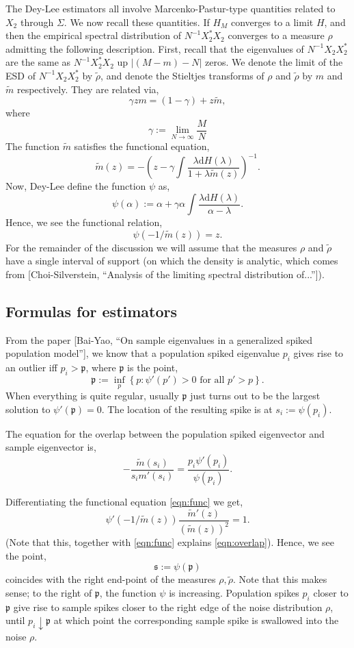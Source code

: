 \documentclass[11 pt, reqno]{article}
\def\beq{\begin{equation}}
\def\eeq{\end{equation}}
\def\mfp{\mathfrak{p}}
\def\mfs{\mathfrak{s}}
\def\d{\mathrm{d}}
\begin{document}
The Dey-Lee estimators all involve Marcenko-Pastur-type quantities related to $X_2$ through $\Sigma$.  We now recall these quantities.  If $H_M$ converges to a limit $H$, and  then the empirical spectral distribution of $N^{-1} X_2^* X_2$ converges to a measure $\rho$ admitting the following description.  First, recall that the eigenvalues of $N^{-1} X_2 X_2^*$ are the same as $N^{-1} X_2^* X_2$ up $|(M-m) - N|$ zeros. We denote the limit of the ESD of $N^{-1} X_2 X_2^*$ by  $\tilde{\rho}$, and denote the Stieltjes transforms of $\rho$ and $\tilde{\rho}$ by $m$ and $\tilde{m}$ respectively.  They are related via,
\beq
\gamma z m = (1 - \gamma ) + z \tilde{m},
\eeq
where
\beq
\gamma := \lim_{N \to \infty} \frac{M}{N}
\eeq
The function $\tilde{m}$ satisfies the functional equation,
\beq
\tilde{m} (z) = - \left( z - \gamma \int \frac{ \lambda \d H ( \lambda ) }{ 1 + \lambda \tilde{m} (z)} \right)^{-1}.
\eeq
Now, Dey-Lee define the function $\psi$ as,
\beq
\psi ( \alpha ) := \alpha + \gamma \alpha \int \frac{ \lambda \d H ( \lambda ) }{ \alpha - \lambda }.
\eeq
Hence, we see the functional relation,
\beq \label{eqn:func}
\psi ( -1 / \tilde{m} (z) ) = z.
\eeq
For the remainder of the discussion we will assume that the measures $\rho$ and $\tilde{\rho}$ have a single interval of support (on which the density is analytic, which comes from [Choi-Silverstein, ``Analysis of the limiting spectral distribution of...'']).  

\subsection{Formulas for estimators}

From the paper [Bai-Yao, ``On sample eigenvalues in a generalized spiked population model''], we know that a population  spiked eigenvalue $p_i$ gives rise to an outlier iff $p_i > \mfp$, where $\mfp$ is the point,
\beq
\mfp := \inf_{p} \left\{ p : \psi' ( p') > 0 \mbox{ for all } p' > p \right\}.
\eeq
When everything is quite regular, usually $\mfp$ just turns out to be the largest solution to $\psi' ( \mfp ) = 0$.   The location of the resulting spike is at $s_i := \psi ( p_i)$.

The equation for the overlap between the population spiked eigenvector and sample eigenvector is,
\beq \label{eqn:overlap}
- \frac{ \tilde{m} (s_i ) }{ s_i m' (s_i ) } = \frac{ p_i \psi' ( p_i ) }{ \psi ( p_i ) }.
\eeq

 Differentiating the functional equation \eqref{eqn:func} we get,
\beq
\psi' ( -1 / \tilde{m} (z) ) \frac{ \tilde{m}' (z) }{ ( \tilde{m} (z) )^2 } = 1.
\eeq
(Note that this, together with \eqref{eqn:func} explains \eqref{eqn:overlap}). 
Hence, we see the point,
\beq
\mfs := \psi ( \mfp )
\eeq
coincides with the right end-point of the measures $\rho, \tilde{\rho}$.  Note that this makes sense; to the right of $\mfp$, the function $\psi$ is increasing.  Population spikes $p_i$ closer to $\mfp$ give rise to sample spikes closer to the right edge of the noise distribution $\rho$, until $p_i \downarrow \mfp$ at which point the corresponding sample spike is swallowed into the noise $\rho$.
\end{document}
